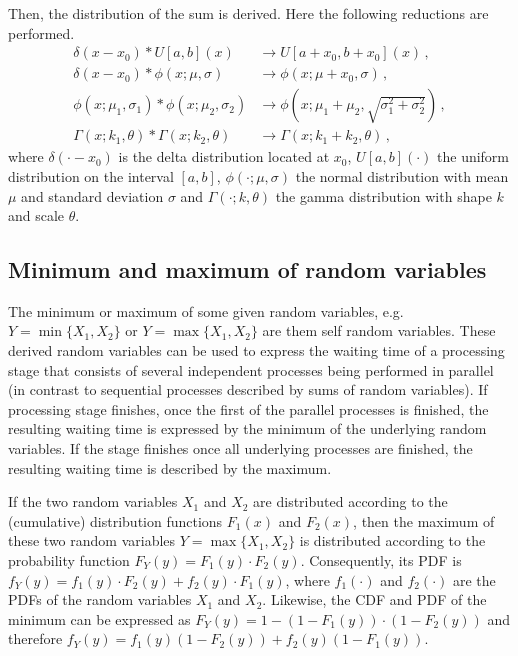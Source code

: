 Then, the distribution of the sum is derived. Here the following reductions are performed.
\begin{align}
 \delta(x-x_0)\ast U[a,b](x) &\longrightarrow U[a+x_0,b+x_0](x)\,, \nonumber \\
 \delta(x-x_0)\ast \phi(x; \mu, \sigma) &\longrightarrow \phi(x; \mu+x_0, \sigma)\,, \nonumber \\
 \phi(x; \mu_1, \sigma_1)\ast \phi(x; \mu_2, \sigma_2) &\longrightarrow 
   \phi(x; \mu_1+\mu_2, \sqrt{\sigma_1^2+\sigma_2^2}) \nonumber\,, \\
 \Gamma(x; k_1, \theta)\ast \Gamma(x; k_2, \theta) &\longrightarrow 
   \Gamma(x; k_1+k_2, \theta)\,, \nonumber
\end{align}
where $\delta(\cdot-x_0)$ is the delta distribution located at $x_0$, $U[a,b](\cdot)$ the uniform
distribution on the interval $[a,b]$, $\phi(\cdot; \mu, \sigma)$ the normal distribution with mean 
$\mu$ and standard deviation $\sigma$ and $\Gamma(\cdot; k, \theta)$ the gamma distribution with
shape $k$ and scale $\theta$.

\subsection{Minimum and maximum of random variables}
The minimum or maximum of some given random variables, e.g. $Y=\min\{X_1,X_2\}$ or 
$Y=\max\{X_1,X_2\}$ are them self random variables. These derived random variables can be used to
express the waiting time of a processing stage that consists of several independent processes being
performed in parallel (in contrast to sequential processes described by sums of random variables). 
If processing stage finishes, once the first of the parallel processes is finished, the 
resulting waiting time is expressed by the minimum of the underlying random variables. If the stage
finishes once all underlying processes are finished, the resulting waiting time is described
by the maximum. 

If the two random variables $X_1$ and $X_2$ are distributed according to the (cumulative) distribution
functions $F_1(x)$ and $F_2(x)$, then the maximum of these two random variables $Y=\max\{X_1,X_2\}$
is distributed according to the probability function $F_Y(y)=F_1(y)\cdot F_2(y)$. Consequently, its PDF
is $f_Y(y)=f_1(y)\cdot F_2(y) + f_2(y)\cdot F_1(y)$, where $f_1(\cdot)$ and $f_2(\cdot)$ are the PDFs
of the random variables $X_1$ and $X_2$. Likewise, the CDF and PDF of the minimum can be expressed as
$F_Y(y)=1-(1-F_1(y))\cdot(1-F_2(y))$ and therefore $f_Y(y) = f_1(y)(1-F_2(y)) + f_2(y)(1-F_1(y))$.

